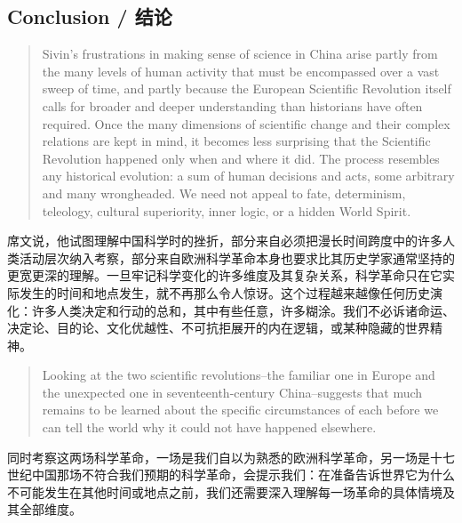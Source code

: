 \documentclass[UTF8,zihao=-4]{ctexart}
\newenvironment{enblock}
  {\par\smallskip\noindent{\scriptsize\bfseries English}\par\begin{quote}\small}
  {\end{quote}}
\newenvironment{zhblock}
  {\par\noindent{\scriptsize\bfseries 中文}\par}
  {\par\medskip}
\begin{document}
\subsection*{Conclusion / 结论}

\begin{enblock}
Sivin's frustrations in making sense of science in China arise partly from the many levels of human activity that must be encompassed over a vast sweep of time, and partly because the European Scientific Revolution itself calls for broader and deeper understanding than historians have often required. Once the many dimensions of scientific change and their complex relations are kept in mind, it becomes less surprising that the Scientific Revolution happened only when and where it did. The process resembles any historical evolution: a sum of human decisions and acts, some arbitrary and many wrongheaded. We need not appeal to fate, determinism, teleology, cultural superiority, inner logic, or a hidden World Spirit.
\end{enblock}
\begin{zhblock}
席文说，他试图理解中国科学时的挫折，部分来自必须把漫长时间跨度中的许多人类活动层次纳入考察，部分来自欧洲科学革命本身也要求比其历史学家通常坚持的更宽更深的理解。一旦牢记科学变化的许多维度及其复杂关系，科学革命只在它实际发生的时间和地点发生，就不再那么令人惊讶。这个过程越来越像任何历史演化：许多人类决定和行动的总和，其中有些任意，许多糊涂。我们不必诉诸命运、决定论、目的论、文化优越性、不可抗拒展开的内在逻辑，或某种隐藏的世界精神。
\end{zhblock}

\begin{enblock}
Looking at the two scientific revolutions--the familiar one in Europe and the unexpected one in seventeenth-century China--suggests that much remains to be learned about the specific circumstances of each before we can tell the world why it could not have happened elsewhere.
\end{enblock}
\begin{zhblock}
同时考察这两场科学革命，一场是我们自以为熟悉的欧洲科学革命，另一场是十七世纪中国那场不符合我们预期的科学革命，会提示我们：在准备告诉世界它为什么不可能发生在其他时间或地点之前，我们还需要深入理解每一场革命的具体情境及其全部维度。
\end{zhblock}
\end{document}
